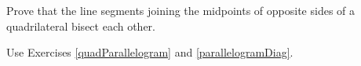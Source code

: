 
\begin{Exercise}[
name={},
title={}, 
difficulty=0,
origin={\cite{SM}}]
Prove that the line segments joining the midpoints of opposite sides of a quadrilateral bisect each other.
\end{Exercise}

\begin{Answer}
Use Exercises \ref{quadParallelogram} and \ref{parallelogramDiag}.
\end{Answer}
